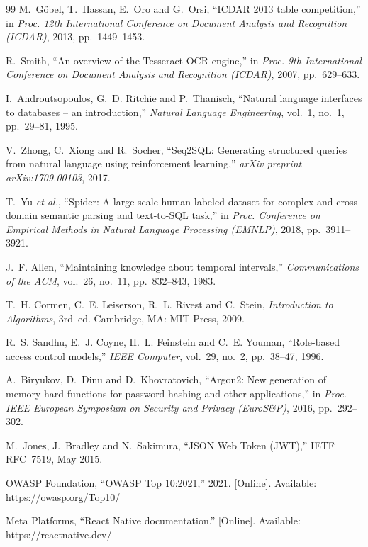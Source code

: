 \begin{thebibliography}{99}
M.~G\"obel, T.~Hassan, E.~Oro and G.~Orsi, ``ICDAR 2013 table competition,'' in \emph{Proc. 12th
International Conference on Document Analysis and Recognition (ICDAR)}, 2013, pp.~1449--1453.

R.~Smith, ``An overview of the Tesseract OCR engine,'' in \emph{Proc. 9th International Conference on
Document Analysis and Recognition (ICDAR)}, 2007, pp.~629--633.

I.~Androutsopoulos, G.~D. Ritchie and P.~Thanisch, ``Natural language interfaces to databases --
an introduction,'' \emph{Natural Language Engineering}, vol.~1, no.~1, pp.~29--81, 1995.

V.~Zhong, C.~Xiong and R.~Socher, ``Seq2SQL: Generating structured queries from natural language
using reinforcement learning,'' \emph{arXiv preprint arXiv:1709.00103}, 2017.

T.~Yu \emph{et al.}, ``Spider: A large-scale human-labeled dataset for complex and cross-domain
semantic parsing and text-to-SQL task,'' in \emph{Proc. Conference on Empirical Methods in Natural
Language Processing (EMNLP)}, 2018, pp.~3911--3921.

J.~F. Allen, ``Maintaining knowledge about temporal intervals,'' \emph{Communications of the ACM},
vol.~26, no.~11, pp.~832--843, 1983.

T.~H. Cormen, C.~E. Leiserson, R.~L. Rivest and C.~Stein, \emph{Introduction to Algorithms},
3rd~ed. Cambridge, MA: MIT Press, 2009.

R.~S. Sandhu, E.~J. Coyne, H.~L. Feinstein and C.~E. Youman, ``Role-based access control models,''
\emph{IEEE Computer}, vol.~29, no.~2, pp.~38--47, 1996.

A.~Biryukov, D.~Dinu and D.~Khovratovich, ``Argon2: New generation of memory-hard functions for
password hashing and other applications,'' in \emph{Proc. IEEE European Symposium on Security and
Privacy (EuroS\&P)}, 2016, pp.~292--302.

M.~Jones, J.~Bradley and N.~Sakimura, ``JSON Web Token (JWT),'' IETF RFC~7519, May 2015.

OWASP Foundation, ``OWASP Top 10:2021,'' 2021. [Online]. Available: https://owasp.org/Top10/

Meta Platforms, ``React Native documentation.'' [Online]. Available: https://reactnative.dev/


\end{thebibliography}
